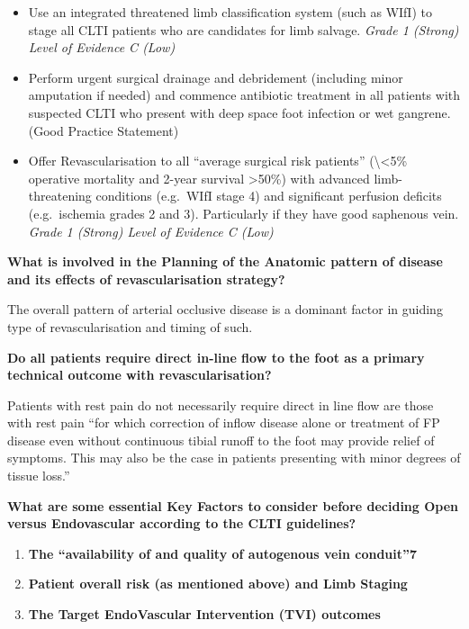 \documentclass[
]{book}
\begin{document}
\begin{itemize}
\item
  Use an integrated threatened limb classification system (such as WIfI)
  to stage all CLTI patients who are candidates for limb salvage. \emph{Grade
  1 (Strong) Level of Evidence C (Low)}
\item
  Perform urgent surgical drainage and debridement (including minor
  amputation if needed) and commence antibiotic treatment in all patients
  with suspected CLTI who present with deep space foot infection or wet
  gangrene. (Good Practice Statement)
\item
  Offer Revascularisation to all ``average surgical risk patients'' (\textbackslash\textless5\%
  operative mortality and 2-year survival \textgreater50\%) with advanced
  limb-threatening conditions (e.g.~WIfI stage 4) and significant
  perfusion deficits (e.g.~ischemia grades 2 and 3). Particularly if they
  have good saphenous vein. \emph{Grade 1 (Strong) Level of Evidence C (Low)}
  \citep{adam2005, norgren2007}
\end{itemize}

\textbf{What is involved in the Planning of the Anatomic pattern of disease
and its effects of revascularisation strategy?}

The overall pattern of arterial occlusive disease is a dominant factor
in guiding type of revascularisation and timing of such.

\textbf{Do all patients require direct in-line flow to the foot as a primary
technical outcome with revascularisation?}

Patients with rest pain do not necessarily require direct in line flow
are those with rest pain ``for which correction of inflow disease alone
or treatment of FP disease even without continuous tibial runoff to the
foot may provide relief of symptoms. This may also be the case in patients
presenting with minor degrees of tissue loss.''

\textbf{What are some essential Key Factors to consider before deciding Open
versus Endovascular according to the CLTI guidelines?}

\begin{enumerate}
\def\labelenumi{\arabic{enumi}.}
\item
  \textbf{The ``availability of and quality of autogenous vein conduit''7}
\item
  \textbf{Patient overall risk (as mentioned above) and Limb Staging}
\item
  \textbf{The Target EndoVascular Intervention (TVI) outcomes}
\end{enumerate}
\end{document}
